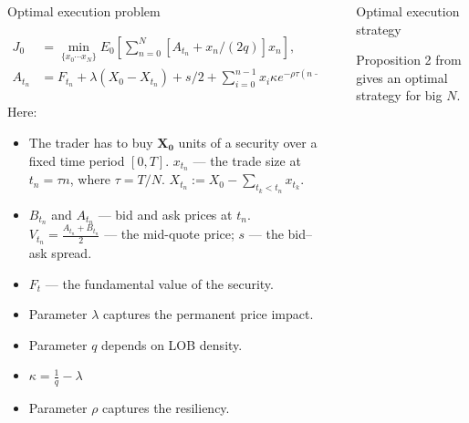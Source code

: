 \documentclass[]{beamer}
\begin{document}
\begin{frame}[t]
\begin{columns}[t]
\begin{column}{\onecolwid}
\begin{block}{Optimal execution problem}
        
        \begin{align*}
           J_0 &= \min _{\{x_0 \cdots x_N \}} E_0 \left[ \sum _{n=0}^N [A_{t_n} + x_n /(2q)] x_n\right],  \\
           A_{t_n} &= F_{t_n} + \lambda (X_0 - X_{t_n}) + s/2 + \sum _{i=0}^{n-1} x_i \kappa e^{- \rho \tau (n - i)}.
        \end{align*}
        
       Here:
       \begin{itemize}
        \item The trader has to buy $\mathbf{X_0}$ units of a security over a ﬁxed time period $[0,T]$. $x_{t_n}$ 
        --- the trade size at $t_n = \tau n$, where $\tau = T / N$. $X_{t_n} := X_0 - \sum _{t_k < t_n} x_{t_k}$. 
        \item $B_{t_n}$ and $A_{t_n}$ --- bid and ask prices at $t_n$. $V_{t_n} = \frac{A_{t_n} + B_{t_n}}{2}$ 
        --- the mid-quote price; $s$ --- the bid–ask spread.
        \item $F_t$ --- the fundamental value of the security.
        \item Parameter $\lambda$ captures the permanent price impact.
        \item Parameter $q$ depends on LOB density. 
        \item $\kappa = \frac{1}{q} - \lambda $
        \item Parameter $\rho$ captures the resiliency.

       \end{itemize}
        \end{block}
    
    
    \end{column} 
    \begin{column}{\sepwid}\end{column} %
    
    \begin{column}{\onecolwid} %
    

    \begin{block}{Optimal execution strategy }
    
    Proposition 2 from \cite{obizhaeva2013optimal} gives an optimal strategy for big $N$.
    

\end{block}
\end{column}
\end{columns}
\end{frame}
\end{document}
